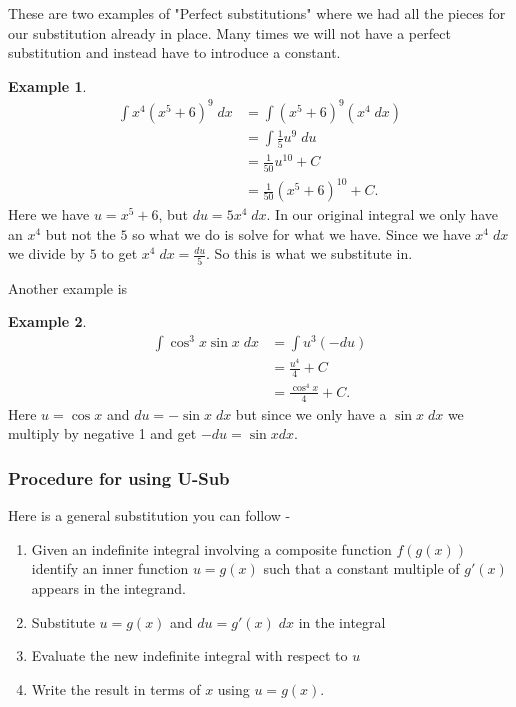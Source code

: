 \documentclass[12pt,reqno]{article}
\theoremstyle{definition}
\newtheorem*{Example}{Example}
\begin{document}
These are two examples of "Perfect substitutions" where we had all the pieces for our substitution already in place. Many times we will not have a perfect substitution and instead have to introduce a constant. 
\begin{Example}
	\begin{align*}
		\int x^4 (x^5 + 6)^{9} \;dx &= \int (x^5 + 6)^9 (x^4 \; dx) \\
								    &= \int \frac{1}{5} u^9 \; du \\
								    &= \frac{1}{50} u^10 + C \\
								    &= \frac{1}{50}(x^5 + 6)^{10} + C. 
	\end{align*}
	Here we have $u = x^5 + 6$, but $du = 5x^4 \; dx$. In our original integral we only have an $x^4$ but not the $5$ so what we do is solve for what we have. Since we have $x^4 \; dx$ we divide by $5$ to get $x^4 \; dx = \frac{du}{5}$. So this is what we substitute in. 
\end{Example}

Another example is 
\begin{Example}
	\begin{align*}
		\int \cos^3 x \sin x \; dx &= \int u^3 (- du) \\
								   &= \frac{u^4}{4} + C \\
								   &= \frac{\cos^4 x}{4} + C.
	\end{align*}
	Here $u = \cos x$ and $du = - \sin x \; dx$ but since we only have a $\sin x \; dx$ we multiply by negative 1 and get $- du = \sin x dx$. 
\end{Example}

\subsubsection{Procedure for using U-Sub} 
Here is a general substitution you can follow - 
\begin{enumerate}
	\item[1.] Given an indefinite integral involving a composite function $f(g(x))$ identify an inner function $u = g(x)$ such that a constant multiple of $g'(x)$ appears in the integrand. 
	\item[2.] Substitute $u = g(x)$ and $du = g'(x) \;dx$ in the integral 
	\item[3.] Evaluate the new indefinite integral with respect to $u$
	\item[4.] Write the result in terms of $x$ using $u = g(x)$. 
\end{enumerate}
\end{document}
